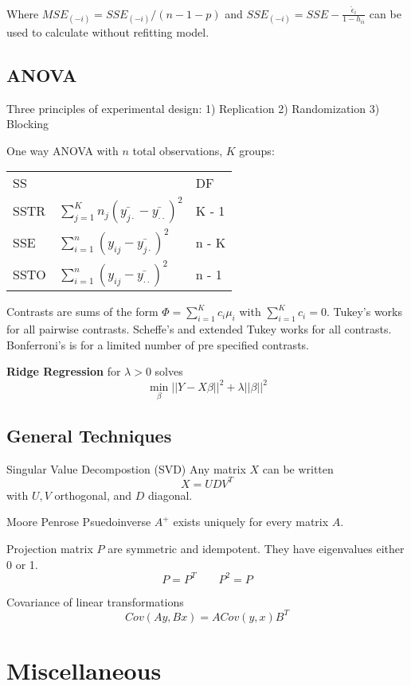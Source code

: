 \documentclass[10pt, twocolumn]{article}
\begin{document}
Where $MSE_{(-i)} = SSE_{(-i)} / (n - 1 - p)$ and
$SSE_{(-i)} = SSE - \frac{\hat{\epsilon}_i}{1 - h_{ii}}$ can be used to
calculate without refitting model.

\subsection{ANOVA}

Three principles of experimental design: 1) Replication 2) Randomization 3)
Blocking

One way ANOVA with $n$ total observations, $K$ groups:

{
\centering
\begin{tabular}{lll}
    SS   &  & DF     \\
    SSTR & $\sum_{j=1}^K n_j (\bar{y_{j \cdot}} - \bar{y_{\cdot \cdot}})^2$  & K - 1 \\
    SSE  & $\sum_{i=1}^n (y_{ij} - \bar{y_{j \cdot}})^2$  & n - K \\
    SSTO & $\sum_{i=1}^n (y_{ij} - \bar{y_{\cdot \cdot}})^2$  & n - 1 
\end{tabular}
}

Contrasts are sums of the form $\Phi = \sum_{i=1}^K c_i \mu_i$ with
$\sum_{i=1}^K c_i = 0$.
Tukey's works for all pairwise contrasts.
Scheffe's and extended Tukey works for all contrasts.
Bonferroni's is for a limited number of pre specified contrasts.

\textbf{Ridge Regression} for $\lambda > 0$ solves
\[
    \min_\beta ||Y - X\beta||^2 + \lambda ||\beta||^2
\]

\subsection{General Techniques}

Singular Value Decompostion (SVD) Any matrix $X$ can be written
\[
    X = UDV^T
\]
with $U, V$ orthogonal, and $D$ diagonal.

Moore Penrose Psuedoinverse $A^+$ exists uniquely for every matrix $A$.

Projection matrix $P$ are symmetric and idempotent. They have eigenvalues
either 0 or 1.
\[
    P = P^T \qquad P^2 = P
\]

Covariance of linear transformations
\[
    Cov(Ay, Bx) = A Cov(y, x) B^T
\]


\newpage

\section{Miscellaneous}
\end{document}
